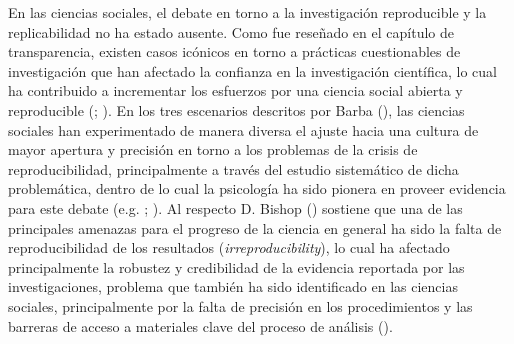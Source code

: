 \documentclass[
  spanish,
  a4paper,
  oneside]{scrbook}
\begin{document}
En las ciencias sociales, el debate en torno a la investigación
reproducible y la replicabilidad no ha estado ausente. Como fue reseñado
en el capítulo de transparencia, existen casos icónicos en torno a
prácticas cuestionables de investigación que han afectado la confianza
en la investigación científica, lo cual ha contribuido a incrementar los
esfuerzos por una ciencia social abierta y reproducible
(;
). En los
tres escenarios descritos por Barba
(), las ciencias sociales
han experimentado de manera diversa el ajuste hacia una cultura de mayor
apertura y precisión en torno a los problemas de la crisis de
reproducibilidad, principalmente a través del estudio sistemático de
dicha problemática, dentro de lo cual la psicología ha sido pionera en
proveer evidencia para este debate (e.g.
; ). Al respecto D. Bishop ()
sostiene que una de las principales amenazas para el progreso de la
ciencia en general ha sido la falta de reproducibilidad de los
resultados (\emph{irreproducibility}), lo cual ha afectado
principalmente la robustez y credibilidad de la evidencia reportada por
las investigaciones, problema que también ha sido identificado en las
ciencias sociales, principalmente por la falta de precisión en los
procedimientos y las barreras de acceso a materiales clave del proceso
de análisis ().
\end{document}
